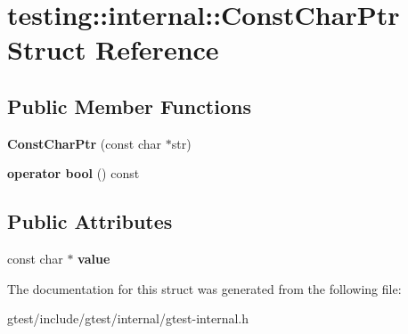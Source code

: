 \hypertarget{structtesting_1_1internal_1_1ConstCharPtr}{}\section{testing\+:\+:internal\+:\+:Const\+Char\+Ptr Struct Reference}
\label{structtesting_1_1internal_1_1ConstCharPtr}
\subsection*{Public Member Functions}
\begin{DoxyCompactItemize}
\item 
\mbox{\label{structtesting_1_1internal_1_1ConstCharPtr_ae94f6453fa679d815994eccc63062907}} 
{\bfseries Const\+Char\+Ptr} (const char $\ast$str)
\item 
\mbox{\label{structtesting_1_1internal_1_1ConstCharPtr_a85c8174b5d4db8fe96863509ba767b27}} 
{\bfseries operator bool} () const
\end{DoxyCompactItemize}
\subsection*{Public Attributes}
\begin{DoxyCompactItemize}
\item 
\mbox{\label{structtesting_1_1internal_1_1ConstCharPtr_adba40d23d5986904b605946f643cf26e}} 
const char $\ast$ {\bfseries value}
\end{DoxyCompactItemize}


The documentation for this struct was generated from the following file\+:\begin{DoxyCompactItemize}
\item 
gtest/include/gtest/internal/gtest-\/internal.\+h\end{DoxyCompactItemize}
